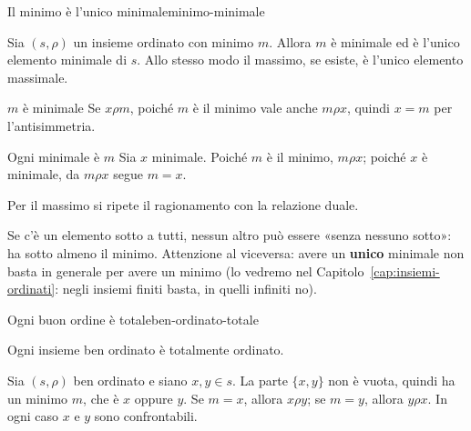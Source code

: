 \begin{concetto}
\begin{Teorema}{Il minimo è l'unico minimale}{minimo-minimale}
    \begin{prerequisiti}
    \end{prerequisiti}
    Sia $(s, \rho)$ un insieme ordinato con minimo $m$. Allora $m$ è minimale ed è l'unico elemento minimale di $s$.
    Allo stesso modo il massimo, se esiste, è l'unico elemento massimale.
\end{Teorema}
\begin{dimostrazione}
    \begin{caso}{$m$ è minimale}
        Se $x \rho m$, poiché $m$ è il minimo vale anche $m \rho x$, quindi $x = m$ per l'antisimmetria.
    \end{caso}
    \begin{caso}{Ogni minimale è $m$}
        Sia $x$ minimale. Poiché $m$ è il minimo, $m \rho x$; poiché $x$ è minimale, da $m \rho x$ segue $m = x$.
    \end{caso}
    Per il massimo si ripete il ragionamento con la relazione duale.
\end{dimostrazione}
\end{concetto}

\begin{spiegazione}
    Se c'è un elemento sotto a tutti, nessun altro può essere «senza nessuno sotto»: ha sotto almeno il minimo. Attenzione al
    viceversa: avere un \textbf{unico} minimale non basta in generale per avere un minimo (lo vedremo nel
    Capitolo~\ref{cap:insiemi-ordinati}: negli insiemi finiti basta, in quelli infiniti no).
\end{spiegazione}


\begin{concetto}
\begin{Teorema}{Ogni buon ordine è totale}{ben-ordinato-totale}
    \begin{prerequisiti}
    \end{prerequisiti}
    Ogni insieme ben ordinato è totalmente ordinato.
\end{Teorema}
\begin{dimostrazione}
    Sia $(s, \rho)$ ben ordinato e siano $x, y \in s$. La parte $\{x, y\}$ non è vuota, quindi ha un minimo $m$, che è $x$ oppure $y$.
    Se $m = x$, allora $x \rho y$; se $m = y$, allora $y \rho x$. In ogni caso $x$ e $y$ sono confrontabili.
\end{dimostrazione}
\end{concetto}

